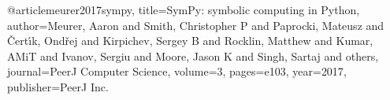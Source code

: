@article{meurer2017sympy, 
  title={SymPy: symbolic computing in Python}, 
  author={Meurer, Aaron and Smith, Christopher P and Paprocki, Mateusz and {\v{C}}ert{\'\i}k, Ond{\v{r}}ej and Kirpichev, Sergey B and Rocklin, Matthew and Kumar, AMiT and Ivanov, Sergiu and Moore, Jason K and Singh, Sartaj and others}, 
  journal={PeerJ Computer Science}, 
  volume={3}, 
  pages={e103}, 
  year={2017}, 
  publisher={PeerJ Inc.}}

